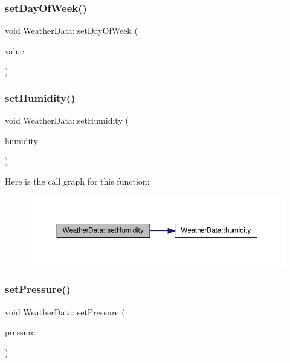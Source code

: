 \subsubsection{\texorpdfstring{set\+Day\+Of\+Week()}{setDayOfWeek()}}
{\footnotesize\ttfamily void Weather\+Data\+::set\+Day\+Of\+Week (\begin{DoxyParamCaption}\item[{const Q\+String \&}]{value }\end{DoxyParamCaption})}

\mbox{\label{class_weather_data_aad895695b5f0651c58657973f2140509}} 
\subsubsection{\texorpdfstring{set\+Humidity()}{setHumidity()}}
{\footnotesize\ttfamily void Weather\+Data\+::set\+Humidity (\begin{DoxyParamCaption}\item[{const Q\+String \&}]{humidity }\end{DoxyParamCaption})}

Here is the call graph for this function\+:
\nopagebreak
\begin{figure}[H]
\begin{center}
\leavevmode
\includegraphics[width=350pt]{class_weather_data_aad895695b5f0651c58657973f2140509_cgraph}
\end{center}
\end{figure}
\mbox{\label{class_weather_data_ad5b453016656864e2bc3a09fc75919a0}} 
\subsubsection{\texorpdfstring{set\+Pressure()}{setPressure()}}
{\footnotesize\ttfamily void Weather\+Data\+::set\+Pressure (\begin{DoxyParamCaption}\item[{const Q\+String \&}]{pressure }\end{DoxyParamCaption})}

